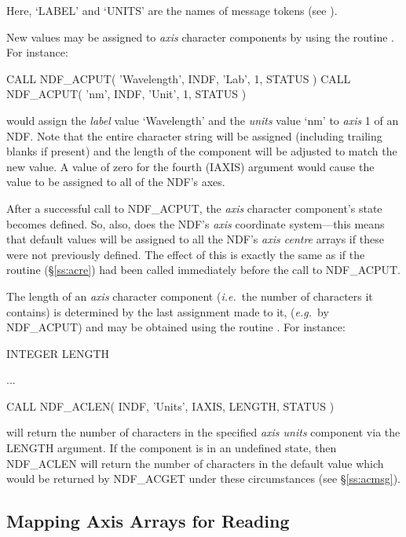 \documentclass[twoside,11pt,nolof]{starlink}
\providecommand{\st}[1]{{\emph{#1}}}
\begin{document}
Here, `LABEL' and `UNITS' are the names of message tokens (see
).

New values may be assigned to \st{axis\/} character components by using the
routine .
For instance:

\small
\begin{terminalv}
      CALL NDF_ACPUT( 'Wavelength', INDF, 'Lab', 1, STATUS )
      CALL NDF_ACPUT( 'nm', INDF, 'Unit', 1, STATUS )
\end{terminalv}
\normalsize

would assign the \st{label\/} value `Wavelength' and the \st{units\/} value
`nm' to \st{axis\/} 1 of an NDF.
Note that the entire character string will be assigned (including trailing
blanks if present) and the length of the component will be adjusted to match
the new value.
A value of zero for the fourth (IAXIS) argument would cause the value to be
assigned to all of the NDF's axes.

After a successful call to NDF\_ACPUT, the \st{axis\/} character
component's state becomes defined.
So, also, does the NDF's \st{axis\/} coordinate system---this means that
default values will be assigned to all the NDF's \st{axis centre\/} arrays
if these were not previously defined.
The effect of this is exactly the same as if the routine 
(\S\ref{ss:acre}) had been called immediately before the call to NDF\_ACPUT.

The length of an \st{axis\/} character component (\st{i.e.}\ the number of
characters it contains) is determined by the last assignment made to it,
(\st{e.g.}\ by NDF\_ACPUT) and may be obtained using the routine
.
For instance:

\small
\begin{terminalv}
      INTEGER LENGTH

      ...

      CALL NDF_ACLEN( INDF, 'Units', IAXIS, LENGTH, STATUS )
\end{terminalv}
\normalsize

will return the number of characters in the specified \st{axis units\/}
component via the LENGTH argument.
If the component is in an undefined state, then NDF\_ACLEN will return
the number of characters in the default value which would be returned
by NDF\_ACGET under these circumstances (see \S\ref{ss:acmsg}).

\subsection{Mapping Axis Arrays for Reading}
\end{document}
